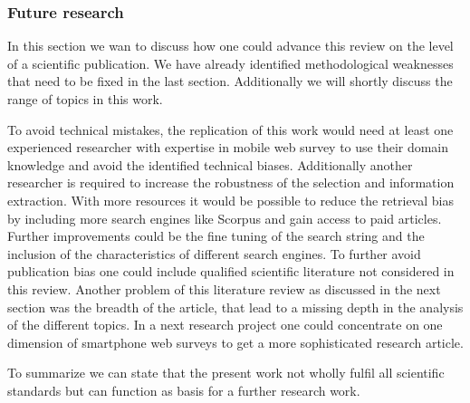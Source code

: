 \subsubsection{Future research}
In this section we wan to discuss how one could advance this review on the level of a scientific publication. We have already identified methodological weaknesses that need to be fixed in the last section. Additionally we will shortly discuss the range of topics in this work.  

To avoid technical mistakes, the replication of this work would need at least one experienced researcher with expertise in mobile web survey to use their domain knowledge and avoid the identified technical biases. Additionally another researcher is required to increase the robustness of the selection and information extraction. With more resources it would be possible to reduce the retrieval bias by including more search engines like Scorpus and gain access to paid articles. Further improvements could be the fine tuning of the search string and the inclusion of the characteristics of different search engines. To further avoid publication bias one could include qualified scientific literature not considered in this review. Another problem of this literature review as discussed in the next section was the breadth of the article, that lead to a missing depth in the analysis of the different topics. In a next research project one could concentrate on one dimension of smartphone web surveys to get a more sophisticated research article.

To summarize we can state that the present work not wholly fulfil all scientific standards but can function as basis for a further research work.